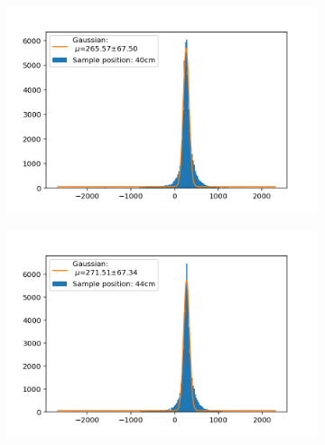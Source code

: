 \documentclass[]{article}
\begin{document}
\begin{figure}[H]
\medskip
\begin{subfigure}{0.48\textwidth}
\includegraphics[width=\linewidth]{Plots/Pos/40cm.png}
\end{subfigure}
\begin{subfigure}[c]{0.48\linewidth}
\includegraphics[width=\linewidth]{Plots/Pos/44cm.png}
\end{subfigure}


\end{figure}
\end{document}
